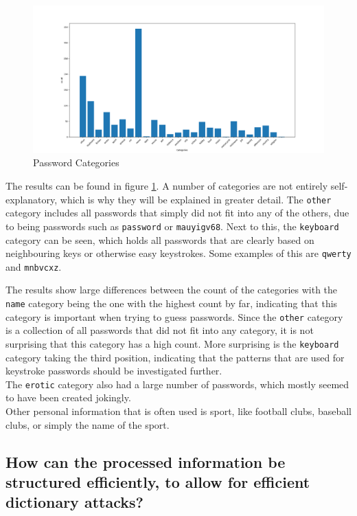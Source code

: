 \documentclass[a4paper,12pt]{article}
\begin{document}
\begin{figure}[!ht]
  \centering
  \hspace*{-4.3cm}
  \includegraphics[width=1.7\textwidth]{password_categories}
  \caption{Password Categories}
  \label{fig:pcat}
\end{figure}

The results can be found in figure \ref{fig:pcat}. A number of categories are not entirely self-explanatory, which is why they will be explained in greater detail. The \lstinline{other} category includes all passwords that simply did not fit into any of the others, due to being passwords such as \lstinline{password} or \lstinline{mauyigv68}. Next to this, the \lstinline{keyboard} category can be seen, which holds all passwords that are clearly based on neighbouring keys or otherwise easy keystrokes. Some examples of this are \lstinline{qwerty} and \lstinline{mnbvcxz}.

The results show large differences between the count of the categories with the \lstinline{name} category being the one with the highest count by far, indicating that this category is important when trying to guess passwords. Since the \lstinline{other} category is a collection of all passwords that did not fit into any category, it is not surprising that this category has a high count. More surprising is the \lstinline{keyboard} category taking the third position, indicating that the patterns that are used for keystroke passwords should be investigated further.\\
The \lstinline{erotic} category also had a large number of passwords, which mostly seemed to have been created jokingly.\\

Other personal information that is often used is sport, like football clubs, baseball clubs, or simply the name of the sport.

\subsection{How can the processed information be structured efficiently, to allow for efficient dictionary attacks?}
\end{document}
